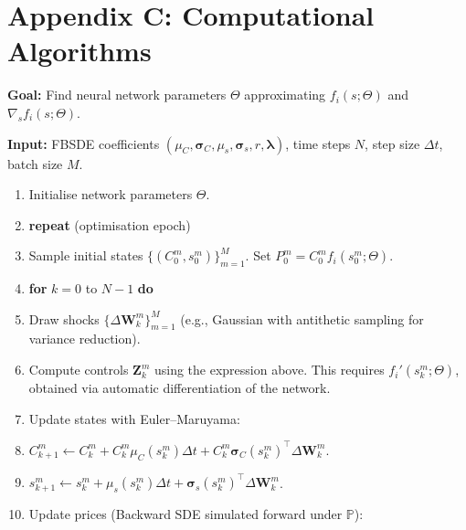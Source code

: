 ﻿\documentclass[11pt,letterpaper,oneside]{article}
\numberwithin{equation}{section}
\newcommand{\1}{\mathbf{1}}
\begin{document}
\section{Appendix C: Computational Algorithms}\label{app:algorithms}

\begin{tcolorbox}[float, title={Algorithm 1: Deep BSDE Training Loop (Infinite-Horizon Adaptation)}, label={alg:deepbsde}]
\small
\textbf{Goal:} Find neural network parameters $\Theta$ approximating $f_i(s;\Theta)$ and $\nabla_s f_i(s;\Theta)$.

\textbf{Input:} FBSDE coefficients $(\mu_C,\bm{\sigma}_C,\mu_s,\bm{\sigma}_s,r,\bm{\lambda})$, time steps $N$, step size $\Delta t$, batch size $M$.

\begin{enumerate}[leftmargin=1.5em,itemsep=0.5em]

  \item Initialise network parameters $\Theta$.

  \item \textbf{repeat} (optimisation epoch)

    \item \quad Sample initial states $\{(C_0^m,s_0^m)\}_{m=1}^M$. Set $P_0^m = C_0^m f_i(s_0^m;\Theta)$.

  \item \quad \textbf{for} $k=0$ to $N-1$ \textbf{do}

    \item \quad\quad Draw shocks $\{\Delta\bm{W}_k^m\}_{m=1}^M$ (e.g., Gaussian with antithetic sampling for variance reduction).

  \item \quad\quad Compute controls $\bm{Z}_k^m$ using the expression above. This requires $f_i'(s_k^m;\Theta)$, obtained via automatic differentiation of the network.

    \item \quad\quad Update states with Euler--Maruyama:

      \item \quad\quad\quad $C_{k+1}^m \leftarrow C_k^m + C_k^m \mu_C(s_k^m)\Delta t + C_k^m \bm{\sigma}_C(s_k^m)^{\top}\Delta\bm{W}_k^m$.

      \item \quad\quad\quad $s_{k+1}^m \leftarrow s_k^m + \mu_s(s_k^m)\Delta t + \bm{\sigma}_s(s_k^m)^{\top}\Delta\bm{W}_k^m$.

      \item \quad\quad Update prices (Backward SDE simulated forward under $\mathbb{P}$):


\end{enumerate}
\end{tcolorbox}
\end{document}
